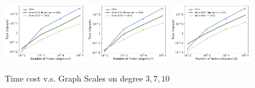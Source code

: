 \begin{figure}[h]
     \centering
         \includegraphics[width=0.32\textwidth]{iclr2023/img/exp/time_3.pdf}
     \hfill
         \includegraphics[width=0.32\textwidth]{iclr2023/img/exp/time_7.pdf}
     \hfill
         \includegraphics[width=0.32\textwidth]{iclr2023/img/exp/time_10.pdf}
     \vspace{-0.3cm}
        \caption{Time cost v.s. Graph Scales on degree $3,7,10$}
        \label{fig:mis_time_app}
\end{figure}
